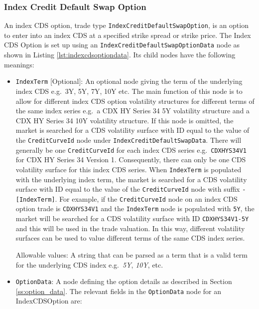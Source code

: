 \subsubsection{Index Credit Default Swap Option}

An index CDS option, trade type \lstinline!IndexCreditDefaultSwapOption!, is an option to enter into an index CDS at a specified strike spread or strike price. The Index CDS Option is set up using an \lstinline!IndexCreditDefaultSwapOptionData! node as shown in Listing \ref{lst:indexcdsoptiondata}. Its child nodes have the following meanings:

\begin{itemize}

\item
\lstinline!IndexTerm! [Optional]: An optional node giving the term of the underlying index CDS e.g.\ 3Y, 5Y, 7Y, 10Y etc. The main function of this node is to allow for different index CDS option volatility structures for different terms of the same index series e.g.\ a CDX HY Series 34 5Y volatility structure and a CDX HY Series 34 10Y volatility structure. If this node is omitted, the market is searched for a CDS volatility surface with ID equal to the value of the \lstinline!CreditCurveId! node under \lstinline!IndexCreditDefaultSwapData!. There will generally be one \lstinline!CreditCurveId! for each index CDS series e.g.\ \lstinline!CDXHYS34V1! for CDX HY Series 34 Version 1. Consequently, there can only be one CDS volatility surface for this index CDS series. When \lstinline!IndexTerm! is populated with the underlying index term, the market is searched for a CDS volatility surface with ID equal to the value of the \lstinline!CreditCurveId! node with suffix \lstinline!-[IndexTerm]!. For example, if the \lstinline!CreditCurveId! node on an index CDS option trade is \lstinline!CDXHYS34V1! and the \lstinline!IndexTerm! node is populated with \lstinline!5Y!, the market will be searched for a CDS volatility surface with ID \lstinline!CDXHYS34V1-5Y! and this will be used in the trade valuation. In this way, different volatility surfaces can be used to value different terms of the same CDS index series.

Allowable values: A string that can be parsed as a term that is a valid term for the underlying CDS index e.g.\ \emph{5Y}, \emph{10Y}, etc.

\item
\lstinline!OptionData!: A node defining the option details as described in Section \ref{ss:option_data}. 
The relevant fields in the \lstinline!OptionData! node for an IndexCDSOption are:


\end{itemize}
